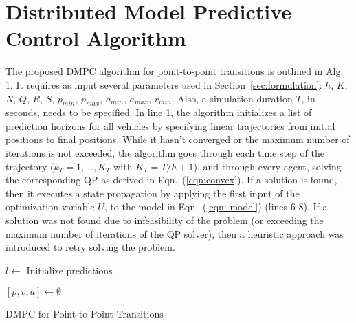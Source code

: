 \section{Distributed Model Predictive Control Algorithm}
\label{sec:problemStatement}
The proposed DMPC algorithm for point-to-point transitions is outlined in Alg. 1. It requires as input several parameters used in Section~\ref{sec:formulation}: $h$, $K$, $N$, $Q$, $R$, $S$, $p_{min}$, $p_{max}$, $a_{min}$, $a_{max}$, $r_{min}$. Also, a simulation duration $T$, in seconds, needs to be specified. In line 1, the algorithm initializes a list of prediction horizons for all vehicles by specifying linear trajectories from initial positions to final positions. While it hasn't converged or the maximum number of iterations is not exceeded, the algorithm goes through each time step of the trajectory ($k_T = {1,...,K_T}$ with $K_T = T/h + 1$), and through every agent, solving the corresponding QP as derived in Eqn.~(\ref{eqn:convex}). If a solution is found, then it executes a state propagation by applying the first input of the optimization variable $U$, to the model in  Eqn.~(\ref{eqn: model}) (lines 6-8). If a solution was not found due to infeasibility of the problem (or exceeding the maximum number of iterations of the QP solver), then a heuristic approach was introduced to retry solving the problem.

\begin{algorithm}
	
	$l \leftarrow$ Initialize predictions
	
{$[p,v,a] \leftarrow \emptyset$ 
}
\KwRet {[p,v,a]}
\caption{DMPC for Point-to-Point Transitions}
\end{algorithm}

